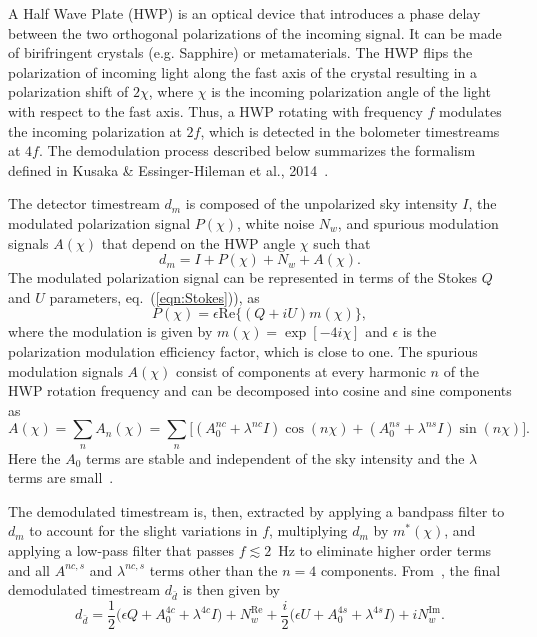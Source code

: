 A Half Wave Plate (HWP) is an optical device that introduces a phase delay between the two orthogonal polarizations of the incoming signal. It can be made of birifringent crystals (e.g. Sapphire) or metamaterials. The HWP flips the polarization of incoming light along the fast axis of the crystal resulting in a polarization shift of $2\chi$, where $\chi$ is the incoming polarization angle of the light with respect to the fast axis. Thus, a HWP rotating with frequency $f$ mo\-du\-la\-tes the incoming polarization at $2f$, which is detected in the bolometer timestreams at $4f$. The demodulation process described below summarizes the formalism defined in Kusaka \& Essinger-Hileman et al., 2014~\cite{ABS_HWP}.

The detector timestream $d_{m}$ is composed of the unpolarized sky intensity $I$, the modulated polarization signal $P(\chi)$, white noise $N_{w}$, and spurious modulation signals $A(\chi)$ that depend on the HWP angle $\chi$ such that
\begin{equation}
d_{m}= I + P(\chi)+ N_{w} + A(\chi).
\end{equation}
The modulated polarization signal can be represented in terms of the Stokes $Q$ and $U$ parameters, eq.~(\ref{eqn:Stokes})), as
\begin{equation}
P(\chi)=\epsilon \mathrm{Re}\{(Q+iU) m(\chi)\},
\end{equation}
where the modulation is given by $m(\chi)=\exp[-4 i \chi]$ and $\epsilon$ is the polarization modulation efficiency factor, which is close to one. The spurious modulation signals $A(\chi)$ consist of components at every harmonic $n$ of the HWP rotation frequency and can be decomposed into cosine and sine components as
\begin{equation}\label{eqn:achi}
A(\chi)= \sum_{n} A_n(\chi)=\sum_{n}\Big[ (A^{nc}_{0} + \lambda^{nc} I) \cos(n\chi) + (A^{ns}_{0} + \lambda^{ns} I) \sin(n\chi)    \Big].
\end{equation}
Here the $A_{0}$ terms are stable and independent of the sky intensity and the $\lambda$ terms are small~\cite{ABS_HWP}.

The demodulated timestream is, then, extracted by applying a bandpass filter to $d_{m}$ to account for the slight variations in $f$, multiplying $d_{m}$ by $m^*(\chi)$, and applying a low-pass filter that passes $f\lesssim2$~Hz to eliminate higher order terms and all $A^{nc,s}$ and $\lambda^{nc,s}$ terms other than the $n=4$ components. From~\cite{ABS_HWP}, the final demodulated timestream $d_{\bar{d}}$ is then given by
\begin{equation}
d_{\bar{d}}=\frac{1}{2}\Big(\epsilon Q + A^{4c}_{0} + \lambda^{4c} I \Big) + N^{\mathrm{Re}}_{w} + \frac{i}{2}\Big(\epsilon U + A^{4s}_{0} + \lambda^{4s} I \Big) + iN^{\mathrm{Im}}_{w}.
\end{equation}

